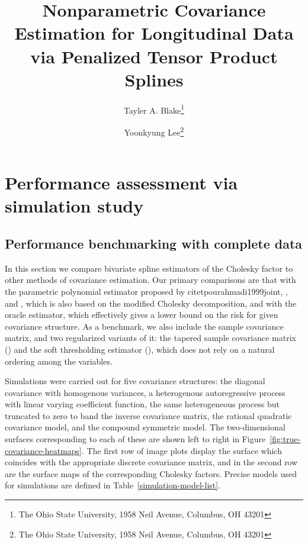 \documentclass[12pt]{article}
\theoremstyle{definition}
\def\bL{\mathbf{L}}
\begin{document}
\def\bL{\mathbf{L}}



\title{ Nonparametric Covariance Estimation for Longitudinal Data via Penalized Tensor Product Splines}

\author{Tayler A. Blake\thanks{The Ohio State University, 1958 Neil Avenue, Columbus, OH 43201} \and  Yoonkyung Lee\thanks{The Ohio State University, 1958 Neil Avenue, Columbus, OH 43201}}


\maketitle

\section{Performance assessment via simulation study} 
\subsection{Performance benchmarking with complete data}

In this section we compare bivariate spline estimators of the Cholesky factor to other methods of covariance estimation. Our primary comparisons are that with the parametric polynomial estimator proposed by citet{pourahmadi1999joint},  \citet{pan2003modelling}, and \citet{pourahmadi2002dynamic}, which is also based on the modified Cholesky decomposition, and with the oracle estimator, which effectively gives a lower bound on the risk for given covariance structure. As a benchmark, we also include the sample covariance matrix, and two regularized variants of it: the tapered sample covariance matrix (\citet{cai2010optimal}) and the soft thresholding estimator (\citet{rothman2009generalized}), which does not rely on a natural ordering among the variables. 

\bigskip

Simulations were carried out for five covariance structures: the diagonal covariance with homogenous variances, a heterogenous autoregressive process with linear varying coefficient function, the same heterogeneous process but truncated to zero to band the inverse covariance matrix, the rational quadratic covariance model, and the compound symmetric model. The two-dimensional surfaces corresponding to each of these are shown left to right in Figure~\ref{fig:true-covariance-heatmaps}. The first row of image plots display the surface which coincides with the appropriate discrete covariance matrix, and in the second row are the surface maps of the corresponding Cholesky factors. Precise models used for simulations are defined in Table~\ref{simulation-model-list}.
\end{document}
